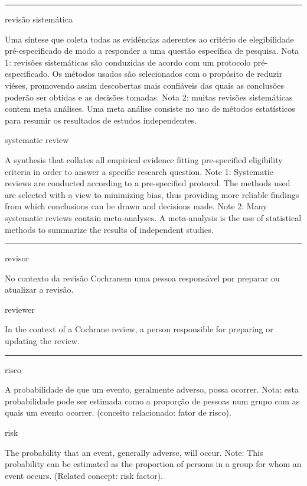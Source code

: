 \documentclass[
  openany]{book}
\begin{document}
\begin{center}\rule{0.5\linewidth}{0.5pt}\end{center}

revisão sistemática

Uma síntese que coleta todas as evidências aderentes ao critério de elegibilidade pré-especificado de modo a responder a uma questão específica de pesquisa. Nota 1: revisões sistemáticas são conduzidas de acordo com um protocolo pré-especificado. Os métodos usados são selecionados com o propósito de reduzir viéses, promovendo assim descobertas mais confiáveis das quais as conclusões poderão ser obtidas e as decisões tomadas. Nota 2: muitas revisões sistemáticas contem meta análises. Uma meta análise consiste no uso de métodos estatísticos para resumir os resultados de estudos independentes.

systematic review

A synthesis that collates all empirical evidence fitting pre-specified eligibility criteria in order to answer a specific research question. Note 1: Systematic reviews are conducted according to a pre-specified protocol. The methods used are selected with a view to minimizing bias, thus providing more reliable findings from which conclusions can be drawn and decisions made. Note 2: Many systematic reviews contain meta-analyses. A meta-analysis is the use of statistical methods to summarize the results of independent studies.

\begin{center}\rule{0.5\linewidth}{0.5pt}\end{center}

revisor

No contexto da revisão Cochranem uma pessoa responsável por preparar ou atualizar a revisão.

reviewer

In the context of a Cochrane review, a person responsible for preparing or updating the review.

\begin{center}\rule{0.5\linewidth}{0.5pt}\end{center}

risco

A probabilidade de que um evento, geralmente adverso, possa ocorrer. Nota: esta probabilidade pode ser estimada como a proporção de pessoas num grupo com as quais um evento ocorrer. (conceito relacionado: fator de risco).

risk

The probability that an event, generally adverse, will occur. Note: This probability can be estimated as the proportion of persons in a group for whom an event occurs. (Related concept: risk factor).
\end{document}

